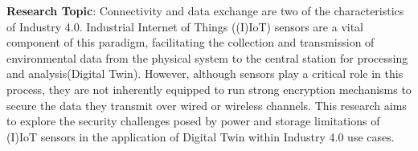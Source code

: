 

\textbf{Research Topic}:
% 
Connectivity and data exchange  are two of the characteristics of Industry 4.0. Industrial Internet of Things ((I)IoT) sensors are a vital component of this paradigm, facilitating the collection and transmission of environmental data from the physical system to the central station for processing and analysis(Digital Twin). However, although sensors play a critical role in this process, they are not inherently equipped to run strong encryption mechanisms to secure the data they transmit over wired or wireless channels. This research aims to explore the security challenges posed by power and storage limitations of (I)IoT sensors in the application of Digital Twin within Industry 4.0 use cases. 




